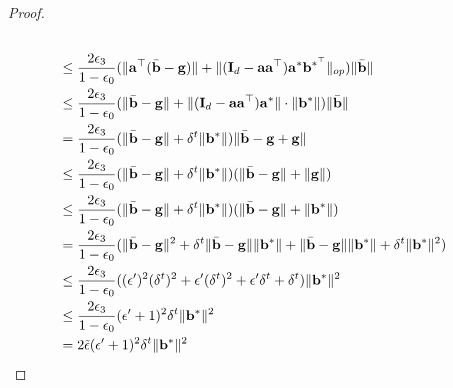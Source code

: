 \documentclass{article}
\theoremstyle{plain}
\theoremstyle{definition}
\theoremstyle{remark}
\begin{document}
\begin{proof}
\begin{align}
 \\ &\leq \frac{2\epsilon_3}{1-\epsilon_0} (\lVert \mathbf{a}^\top (\Bar{\mathbf{b}}-\mathbf{g} )\rVert + \| (\mathbf{I}_d-\mathbf{a}\mathbf{a}^\top)\mathbf{a}^*  \mathbf{b}^{*^\top}\|_{op}) \lVert \Bar{\mathbf{b}} \rVert  \label{grad-egrad-5}\\
 &\leq \frac{2\epsilon_3}{1-\epsilon_0} (\lVert \Bar{\mathbf{b}}-\mathbf{g} \rVert + \| (\mathbf{I}_d-\mathbf{a}\mathbf{a}^\top)\mathbf{a}^*  \| \cdot \|\mathbf{b}^{*}\|) \lVert \Bar{\mathbf{b}} \rVert\\
    & =  \frac{2\epsilon_3}{1-\epsilon_0} (\lVert \Bar{\mathbf{b}}-\mathbf{g} \rVert + \delta^t \lVert \mathbf{b}^*\rVert) \lVert \Bar{\mathbf{b}}-\mathbf{g}+\mathbf{g} \rVert \label{grad-egrad-1} \\
    & \leq \frac{2\epsilon_3}{1-\epsilon_0} (\lVert \Bar{\mathbf{b}}-\mathbf{g} \rVert + \delta^t \lVert \mathbf{b}^*\rVert)(\lVert \Bar{\mathbf{b}}-\mathbf{g} \rVert + \lVert \mathbf{g} \rVert) \\
    & \leq \frac{2\epsilon_3}{1-\epsilon_0} (\lVert \Bar{\mathbf{b}}-\mathbf{g} \rVert + \delta^t \lVert \mathbf{b}^*\rVert)(\lVert \Bar{\mathbf{b}}-\mathbf{g} \rVert + \lVert \mathbf{b}^* \rVert) \label{grad-egrad-2} \\
    &  = \frac{2\epsilon_3}{1-\epsilon_0} ( \lVert \Bar{\mathbf{b}}-\mathbf{g} \rVert^2 + \delta^t \lVert \Bar{\mathbf{b}}-\mathbf{g} \rVert  \lVert \mathbf{b}^* \rVert + \lVert \Bar{\mathbf{b}}-\mathbf{g} \rVert  \lVert \mathbf{b}^* \rVert + \delta^t  \lVert \mathbf{b}^* \rVert^2) \\
    &  \leq \frac{2\epsilon_3}{1-\epsilon_0} ((\epsilon')^2 (\delta^{t})^2 + \epsilon' (\delta^{t})^2 + \epsilon' \delta^t + \delta^t )\lVert \mathbf{b}^* \rVert^2 \\
    & \leq \frac{2\epsilon_3}{1-\epsilon_0} (\epsilon'+1)^2 \delta^t \lVert \mathbf{b}^* \rVert^2 \label{grad-egrad-3}\\
    &  = 2\Tilde{\epsilon} (\epsilon'+1)^2 \delta^t \lVert \mathbf{b}^* \rVert^2 \label{grad-egrad-final}
\end{align}



\end{proof}
\end{document}

